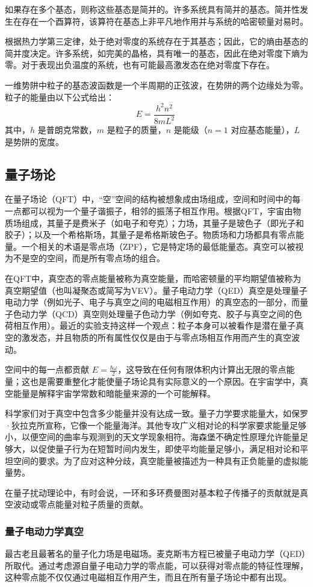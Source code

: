 如果存在多个基态，则称这些基态是简并的。许多系统具有简并的基态。简并性发生在存在一个酉算符，该算符在基态上非平凡地作用并与系统的哈密顿量对易时。

根据热力学第三定律，处于绝对零度的系统存在于其基态；因此，它的熵由基态的简并度决定。许多系统，如完美的晶格，具有唯一的基态，因此在绝对零度下熵为零。对于表现出负温度的系统，也有可能最高激发态在绝对零度下存在。

一维势阱中粒子的基态波函数是一个半周期的正弦波，在势阱的两个边缘处为零。粒子的能量由以下公式给出：
\[
E = \frac{h^2 n^2}{8mL^2}~
\]
其中，\( h \) 是普朗克常数，\( m \) 是粒子的质量，\( n \) 是能级（\( n = 1 \) 对应基态能量），\( L \) 是势阱的宽度。
\subsection{量子场论}
在量子场论（QFT）中，“空”空间的结构被想象成由场组成，空间和时间中的每一点都可以视为一个量子谐振子，相邻的振荡子相互作用。根据QFT，宇宙由物质场组成，其量子是费米子（如电子和夸克）；力场，其量子是玻色子（即光子和胶子）；以及一个希格斯场，其量子是希格斯玻色子。物质场和力场都具有零点能量。一个相关的术语是零点场（ZPF），它是特定场的最低能量态。真空可以被视为不是空的空间，而是所有零点场的组合。

在QFT中，真空态的零点能量被称为真空能量，而哈密顿量的平均期望值被称为真空期望值（也叫凝聚态或简写为VEV）。量子电动力学（QED）真空是处理量子电动力学（例如光子、电子与真空之间的电磁相互作用）的真空态的一部分，而量子色动力学（QCD）真空则处理量子色动力学（例如夸克、胶子与真空之间的色荷相互作用）。最近的实验支持这样一个观点：粒子本身可以被看作是潜在量子真空的激发态，并且物质的所有属性仅仅是由于与零点场相互作用而产生的真空波动。

空间中的每一点都贡献 \( E = \frac{\hbar \omega}{2} \)，这导致在任何有限体积内计算出无限的零点能量；这也是需要重整化才能使量子场论具有实际意义的一个原因。在宇宙学中，真空能量是解释宇宙学常数和暗能量来源的一个可能解释。

科学家们对于真空中包含多少能量并没有达成一致。量子力学要求能量大，如保罗·狄拉克所宣称，它像一个能量海洋。其他专攻广义相对论的科学家要求能量足够小，以便空间的曲率与观测到的天文学现象相符。海森堡不确定性原理允许能量足够大，以促使量子行为在短暂时间内发生，即使平均能量足够小，满足相对论和平坦空间的要求。为了应对这种分歧，真空能量被描述为一种具有正负能量的虚拟能量势。

在量子扰动理论中，有时会说，一环和多环费曼图对基本粒子传播子的贡献就是真空波动或零点能量对粒子质量的贡献。
\subsubsection{量子电动力学真空 } 
最古老且最著名的量子化力场是电磁场。麦克斯韦方程已被量子电动力学（QED）所取代。通过考虑源自量子电动力学的零点能，可以获得对零点能的特征性理解，这种零点能不仅仅通过电磁相互作用产生，而且在所有量子场论中都有出现。

